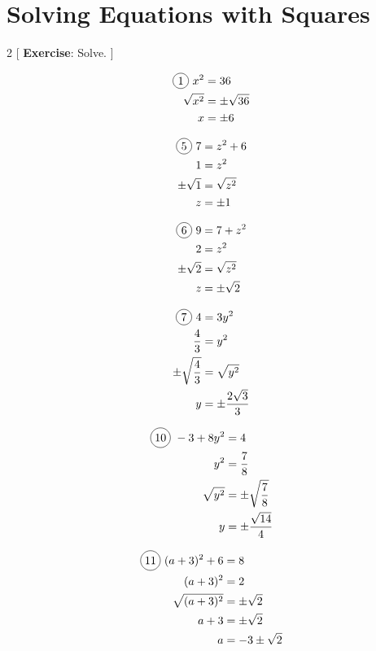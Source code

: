\section{Solving Equations with Squares}

\begin{multicols}{2}
[
  \textbf{Exercise}: Solve.
]

\begin{align*}
  \circled{1}\ x^{2}&=36\\
  \sqrt{x^{2}}&=\pm\sqrt{36}\\
  x&=\pm 6
\end{align*}

\begin{align*}
  \circled{5}\ 7&=z^{2}+6\\
  1&=z^{2}\\
  \pm\sqrt{1}&=\sqrt{z^{2}}\\
  z&=\pm 1
\end{align*}

\begin{align*}
  \circled{6}\ 9&=7+z^{2}\\
  2&=z^{2}\\
  \pm\sqrt{2}&=\sqrt{z^{2}}\\
  z&=\pm \sqrt{2}
\end{align*}

\begin{align*}
  \circled{7}\ 4&=3y^{2}\\
  \frac{4}{3}&=y^{2}\\
  \pm\sqrt{\frac{4}{3}}&=\sqrt{y^{2}}\\
  y&=\pm \frac{2\sqrt{3}}{3}
\end{align*}

\begin{align*}
  \circled{10}\ -3+8y^{2}&=4\\
  y^{2}&=\frac{7}{8}\\
  \sqrt{y^{2}}&=\pm\sqrt{\frac{7}{8}}\\
  y&=\pm\frac{\sqrt{14}}{4}
\end{align*}

\begin{align*}
  \circled{11}\ (a+3)^{2}+6&=8\\
  (a+3)^{2}&=2\\
  \sqrt{(a+3)^{2}}&=\pm\sqrt{2}\\
  a+3&=\pm\sqrt{2}\\
  a&=-3\pm\sqrt{2}
\end{align*}


\end{multicols}
